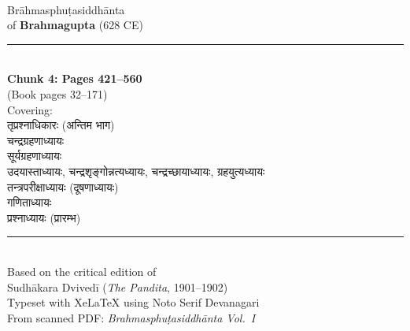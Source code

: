 \documentclass[11pt,a4paper]{article}
\newcommand{\longline}{\noindent\rule{\textwidth}{0.4pt}}
\newcommand{\dev}[1]{{\devanagarifont #1}}
\begin{document}
\thispagestyle{empty}
\begin{center}
\vspace*{2cm}

{\Huge\color{titlecolor}\dev{ब्रह्मस्फुटसिद्धान्त}}\\[0.8cm]
{\LARGE\color{sectioncolor} Brāhmasphuṭasiddhānta}\\[0.3cm]
{\large of \textbf{Brahmagupta} (628 CE)}\\[1.5cm]

\longline\\[0.8cm]

{\Large\textbf{Chunk 4: Pages 421--560}}\\[0.3cm]
{\large (Book pages 32--171)}\\[0.8cm]

{\normalsize Covering:}\\[0.3cm]
\dev{तृप्रश्नाधिकारः (अन्तिम भाग)}\\
\dev{चन्द्रग्रहणाध्यायः}\\
\dev{सूर्यग्रहणाध्यायः}\\
\dev{उदयास्ताध्यायः, चन्द्रशृङ्गोन्नत्यध्यायः, चन्द्रच्छायाध्यायः, ग्रहयुत्यध्यायः}\\
\dev{तन्त्रपरीक्षाध्यायः (दूषणाध्यायः)}\\
\dev{गणिताध्यायः}\\
\dev{प्रश्नाध्यायः (प्रारम्भ)}\\[0.8cm]

\longline\\[0.8cm]

{\small Based on the critical edition of}\\
{\small Sudhākara Dvivedī (\textit{The Pandita}, 1901--1902)}\\[1cm]

{\footnotesize Typeset with XeLaTeX using Noto Serif Devanagari}\\
{\footnotesize From scanned PDF: \textit{Brahmasphuṭasiddhānta Vol.\ I}}

\vfill
\end{center}

\newpage

\tableofcontents
\newpage

\end{document}
